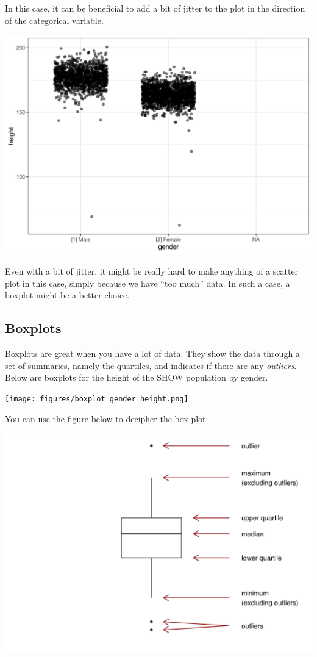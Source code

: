 \documentclass[]{book}
\theoremstyle{definition}
\theoremstyle{definition}
\theoremstyle{definition}
\theoremstyle{remark}
\begin{document}
In this case, it can be beneficial to add a bit of jitter to the plot in the direction of the categorical variable.

\includegraphics{figures/jitter_gender_height.png}

Even with a bit of jitter, it might be really hard to make anything of a scatter plot in this case, simply because we have ``too much'' data. In such a case, a boxplot might be a better choice.

\hypertarget{boxplots}{%
\subsection{Boxplots}\label{boxplots}}

Boxplots are great when you have a lot of data. They show the data through a set of summaries, namely the quartiles, and indicates if there are any \emph{outliers}. Below are boxplots for the height of the SHOW population by gender.

\texttt{[image: figures/boxplot\_gender\_height.png]}

You can use the figure below to decipher the box plot:

\includegraphics{figures/boxplot_explanation.png}
\end{document}
